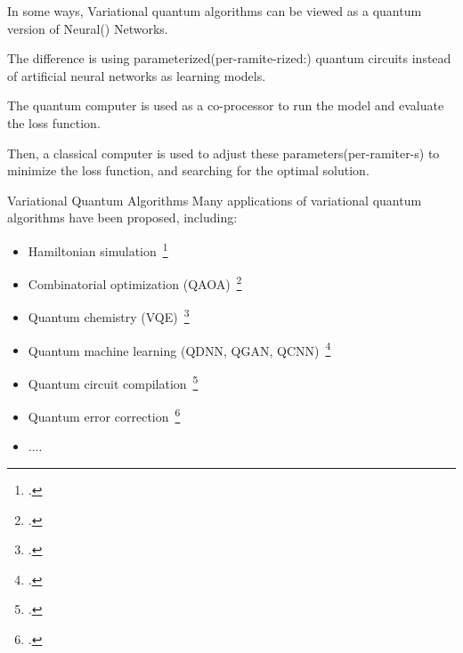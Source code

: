 \documentclass[10pt]{beamer}
\begin{document}
\begin{CJK}{UTF8}{gbsn}
{ In some ways, Variational quantum algorithms can be viewed as a quantum version of Neural() Networks.

 The difference is using parameterized(per-ramite-rized:) quantum circuits instead of artificial neural networks as learning models.


 The quantum computer is used as a co-processor to run the model and evaluate the loss function.
  
 Then, a classical computer is used to %
 adjust these parameters(per-ramiter-s) to minimize the loss function, and searching for the optimal solution.
  
}


\begin{frame}[fragile]{Variational Quantum Algorithms}
 Many applications of variational quantum algorithms have been proposed, including:
  \begin{itemize}
    \item Hamiltonian simulation~\footcite{chen2020demonstration}
    \item Combinatorial optimization (QAOA)~\footcite{farhi2014quantum,moll2018quantum}
    \item Quantum chemistry (VQE)~\footcite{peruzzo2014variational, Kandala2017hardware,li2022toward}
    \item Quantum machine learning (QDNN, QGAN, QCNN)~\footcite{beer2020training,huang2021experimental,havlivcek2019supervised,mitarai2018quantum}
    \item Quantum circuit compilation~\footcite{khatri2019quantum}
    \item Quantum error correction~\footcite{johnson2017qvector,xu2021variational}
    \item ....
  \end{itemize}
  \vspace{1em}
\end{frame}


\end{CJK}
\end{document}
